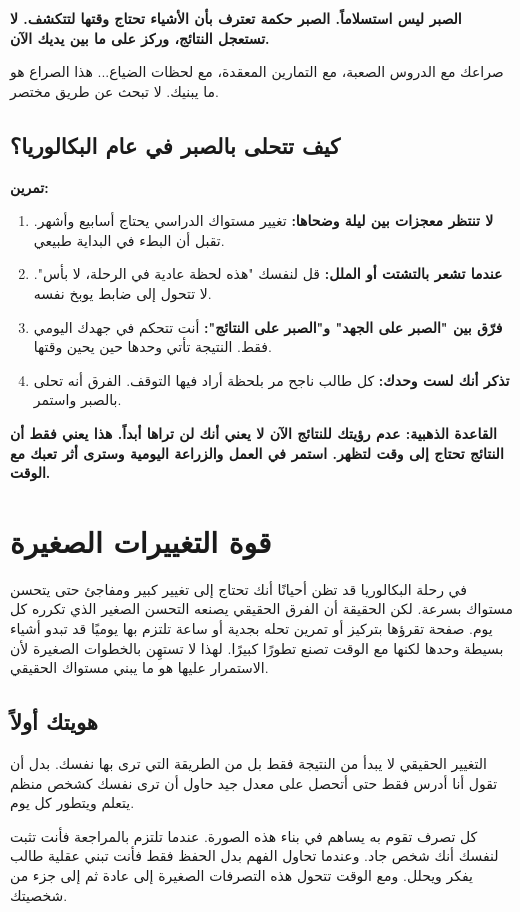 \documentclass[12pt,a4paper]{book}
\newcommand{\importantAr}[1]{%
	\begin{important}
		\bfseries #1
	\end{important}
}
\newcommand{\exerciseAr}[1]{%
	\begin{exercise}
		\textbf{تمرين:} #1
	\end{exercise}
}
\begin{document}
	\importantAr{الصبر ليس استسلاماً. الصبر حكمة تعترف بأن الأشياء تحتاج وقتها لتتكشف. لا تستعجل النتائج، وركز على ما بين يديك الآن.}
	
	صراعك مع الدروس الصعبة، مع التمارين المعقدة، مع لحظات الضياع... هذا الصراع هو ما يبنيك. لا تبحث عن طريق مختصر.
	
	\subsection*{كيف تتحلى بالصبر في عام البكالوريا؟}
		\exerciseAr{
	\begin{enumerate}
		\item \textbf{لا تنتظر معجزات بين ليلة وضحاها:} تغيير مستواك الدراسي يحتاج أسابيع وأشهر. تقبل أن البطء في البداية طبيعي.
		\item \textbf{عندما تشعر بالتشتت أو الملل:} قل لنفسك "هذه لحظة عادية في الرحلة، لا بأس". لا تتحول إلى ضابط يوبخ نفسه.
		\item \textbf{فرّق بين "الصبر على الجهد" و"الصبر على النتائج":} أنت تتحكم في جهدك اليومي فقط. النتيجة تأتي وحدها حين يحين وقتها.
		\item \textbf{تذكر أنك لست وحدك:} كل طالب ناجح مر بلحظة أراد فيها التوقف. الفرق أنه تحلى بالصبر واستمر.
	\end{enumerate}
}
	\importantAr{القاعدة الذهبية: عدم رؤيتك للنتائج الآن لا يعني أنك لن تراها أبداً. هذا يعني فقط أن النتائج تحتاج إلى وقت لتظهر. استمر في العمل والزراعة اليومية وسترى أثر تعبك مع الوقت.}

	\section{قوة التغييرات الصغيرة}
\label{sec:owner-experiences3}
	في رحلة البكالوريا قد تظن أحيانًا أنك تحتاج إلى تغيير كبير ومفاجئ حتى يتحسن مستواك بسرعة. لكن الحقيقة أن الفرق الحقيقي يصنعه التحسن الصغير الذي تكرره كل يوم. صفحة تقرؤها بتركيز أو تمرين تحله بجدية أو ساعة تلتزم بها يوميًا قد تبدو أشياء بسيطة وحدها لكنها مع الوقت تصنع تطورًا كبيرًا. لهذا لا تستهِن بالخطوات الصغيرة لأن الاستمرار عليها هو ما يبني مستواك الحقيقي.
	
	\subsection{هويتك أولاً}
التغيير الحقيقي لا يبدأ من النتيجة فقط بل من الطريقة التي ترى بها نفسك. بدل أن تقول أنا أدرس فقط حتى أتحصل على معدل جيد حاول أن ترى نفسك كشخص منظم يتعلم ويتطور كل يوم.

كل تصرف تقوم به يساهم في بناء هذه الصورة. عندما تلتزم بالمراجعة فأنت تثبت لنفسك أنك شخص جاد. وعندما تحاول الفهم بدل الحفظ فقط فأنت تبني عقلية طالب يفكر ويحلل. ومع الوقت تتحول هذه التصرفات الصغيرة إلى عادة ثم إلى جزء من شخصيتك.
\end{document}
